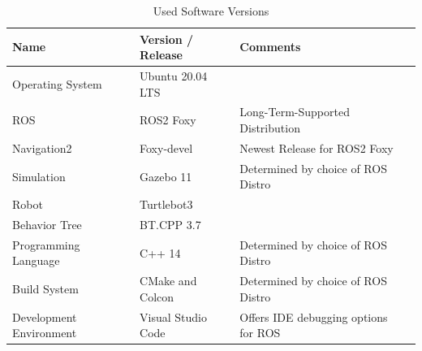 \begin{center}
\begin{table}[ht]
	\caption{Used Software Versions}
	\label{tab:versions}
	\begin{tabular}{ | m{} | m{}| m{} | m{} |} 
  	\hline
  	\textbf{Name} & \textbf{Version / Release} & \textbf{Comments} \\ 
  	\hline
  	Operating System & Ubuntu 20.04 LTS &  \\ 
  	\hline
  	ROS & ROS2 Foxy & Long-Term-Supported Distribution \\ 
  	\hline
  	Navigation2 & Foxy-devel & Newest Release for ROS2 Foxy\\
  	\hline
  	Simulation & Gazebo 11 & Determined by choice of ROS Distro \\
  	\hline  	
  	Robot & Turtlebot3 &  \\
  	\hline
  	Behavior Tree & BT.CPP 3.7 & \\
  	\hline
  	Programming Language & C++ 14 & Determined by choice of ROS Distro \\
  	\hline
  	Build System & CMake and Colcon & Determined by choice of ROS Distro \\
  	\hline
  	Development Environment & Visual Studio Code & Offers IDE debugging options for ROS \\
  	\hline
	\end{tabular}
\end{table}
\end{center}
